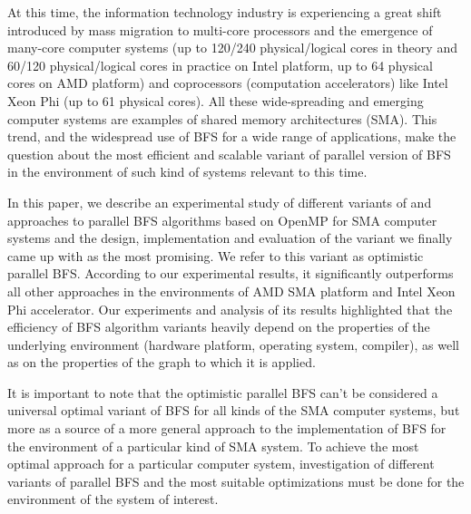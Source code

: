 \documentclass[letterpaper]{article}
\begin{document}
		At this time, the information technology industry is experiencing a great shift introduced by mass migration to multi-core processors and the emergence of many-core computer systems (up to 120/240 physical/logical cores in theory and 60/120 physical/logical cores in practice on Intel platform, up to 64 physical cores on AMD platform) and coprocessors (computation accelerators) like Intel Xeon Phi (up to 61 physical cores).
		All these wide-spreading and emerging computer systems are examples of shared memory architectures (SMA).
		This trend, and the widespread use of BFS for a wide range of applications, make the question about the most efficient and scalable variant of parallel version of BFS in the environment of such kind of systems relevant to this time.
		
		In this paper, we describe an experimental study of different variants of and approaches to parallel BFS algorithms based on OpenMP for SMA computer systems and the design, implementation and evaluation of the variant we finally came up with as the most promising.
		We refer to this variant as optimistic parallel BFS.
		According to our experimental results, it significantly outperforms all other approaches in the environments of AMD SMA platform and Intel Xeon Phi accelerator.
		Our experiments and analysis of its results highlighted that the efficiency of BFS algorithm variants heavily depend on the properties of the underlying environment (hardware platform, operating system, compiler), as well as on the properties of the graph to which it is applied.
		
		It is important to note that the optimistic parallel BFS can't be considered a universal optimal variant of BFS for all kinds of the SMA computer systems, but more as a source of a more general approach to the implementation of BFS for the environment of a particular kind of SMA system.
		To achieve the most optimal approach for a particular computer system, investigation of different variants of parallel BFS and the most suitable optimizations must be done for the environment of the system of interest. %
	
\end{document}
